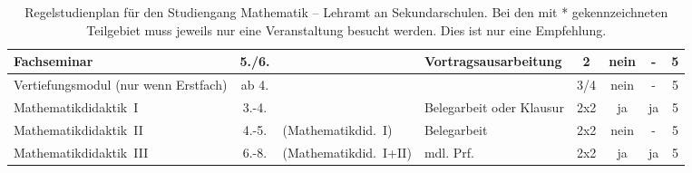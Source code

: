 \begin{table}[tbp]
\begin{footnotesize}
\begin{tabularx}{\textwidth}{|@{~}X@{~}|@{~}c@{~}|@{~}X@{~}|@{~}X@{~}|@{~}c@{~}|@{~}c@{~}|@{~}c@{~}|@{~}c@{~}|}
        Fachseminar & 5./6. & & Vortrags\-ausarbeitung & 2 & nein & - & 5\\\hline
        Ver\-tiefungs\-modul (nur wenn Erst\-fach)&ab 4.&&&3/4&nein&-&5\\\hline
        Mathe\-matik\-didaktik~I &3.-4.&&Beleg\-arbeit oder Klausur&2x2&ja&ja&5\\\hline
        Mathe\-matik\-didaktik~II &4.-5.&(Mathe\-matikdid.~I)&Beleg\-arbeit&2x2&nein&-&5\\\hline
        Mathe\-matik\-didaktik~III &6.-8.&(Mathe\-matikdid.~I+II)&mdl. Prf.&2x2&ja&ja&5\\\hline
    \end{tabularx}
    \end{footnotesize}
    \caption{\label{plan-las}Regelstudienplan für den Studiengang Mathematik -- Lehramt an Sekundarschulen. Bei den mit * gekennzeichneten Teilgebiet muss jeweils nur eine Veranstaltung besucht werden. Dies ist nur eine Empfehlung.}
\end{table}


